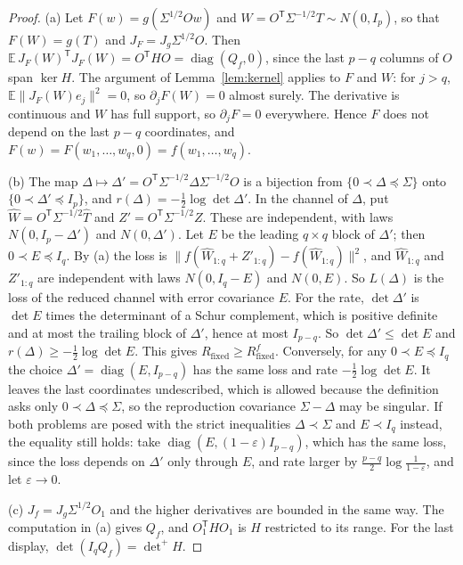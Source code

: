 \documentclass[11pt,onecolumn]{IEEEtran}
\newcommand{\E}{\mathbb{E}}
\newcommand{\Rfix}{R_{\mathrm{fixed}}}
\begin{document}
\begin{proof}
(a) Let $F(w)=g(\Sigma^{1/2}Ow)$ and $W=O^{\mathsf T}\Sigma^{-1/2}T\sim N(0,I_p)$, so that
$F(W)=g(T)$ and $J_F=J_g\Sigma^{1/2}O$. Then
$\E\,J_F(W)^{\mathsf T}J_F(W)=O^{\mathsf T}HO=\operatorname{diag}(Q_f,0)$, since the last
$p-q$ columns of $O$ span $\ker H$. The argument of Lemma~\ref{lem:kernel} applies to $F$
and $W$: for $j>q$, $\E\|J_F(W)e_j\|^2=0$, so $\partial_jF(W)=0$ almost surely. The
derivative is continuous and $W$ has full support, so $\partial_jF=0$ everywhere. Hence
$F$ does not depend on the last $p-q$ coordinates, and $F(w)=F(w_1,\dots,w_q,0)=f(w_1,\dots,w_q)$.

(b) The map $\Delta\mapsto\Delta'=O^{\mathsf T}\Sigma^{-1/2}\Delta\Sigma^{-1/2}O$ is a
bijection from $\{0\prec\Delta\preceq\Sigma\}$ onto $\{0\prec\Delta'\preceq I_p\}$, and
$r(\Delta)=-\tfrac12\log\det\Delta'$. In the channel of $\Delta$, put
$\hat W=O^{\mathsf T}\Sigma^{-1/2}\hat T$ and $Z'=O^{\mathsf T}\Sigma^{-1/2}Z$. These are
independent, with laws $N(0,I_p-\Delta')$ and $N(0,\Delta')$. Let $E$ be the leading
$q\times q$ block of $\Delta'$; then $0\prec E\preceq I_q$. By (a) the loss is
$\|f(\hat W_{1:q}+Z'_{1:q})-f(\hat W_{1:q})\|^2$, and $\hat W_{1:q}$ and $Z'_{1:q}$ are
independent with laws $N(0,I_q-E)$ and $N(0,E)$. So $L(\Delta)$ is the loss of the reduced
channel with error covariance $E$. For the rate, $\det\Delta'$ is $\det E$ times the
determinant of a Schur complement, which is positive definite and at most the trailing
block of $\Delta'$, hence at most $I_{p-q}$. So $\det\Delta'\le\det E$ and
$r(\Delta)\ge-\tfrac12\log\det E$. This gives $\Rfix\ge\Rfix^{f}$. Conversely, for any
$0\prec E\preceq I_q$ the choice $\Delta'=\operatorname{diag}(E,I_{p-q})$ has the same
loss and rate $-\tfrac12\log\det E$. It leaves the last coordinates undescribed, which is
allowed because the definition asks only $0\prec\Delta\preceq\Sigma$, so the reproduction
covariance $\Sigma-\Delta$ may be singular. If both problems are posed with the strict inequalities $\Delta\prec\Sigma$ and $E\prec I_q$
instead, the equality still holds: take
$\operatorname{diag}(E,(1-\varepsilon)I_{p-q})$, which has the same loss, since the loss
depends on $\Delta'$ only through $E$, and rate larger by
$\tfrac{p-q}2\log\tfrac1{1-\varepsilon}$, and let $\varepsilon\to0$.

(c) $J_f=J_g\Sigma^{1/2}O_1$ and the higher derivatives are bounded in the same way. The
computation in (a) gives $Q_f$, and $O_1^{\mathsf T}HO_1$ is $H$ restricted to its range.
For the last display, $\det(I_qQ_f)={\det}^{+}H$.
\end{proof}
\end{document}

